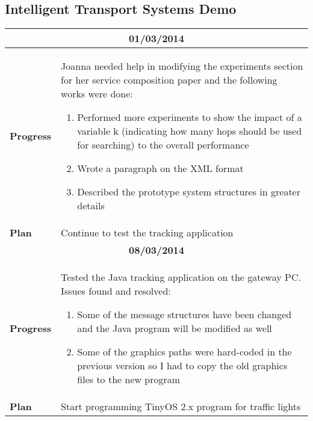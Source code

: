 \subsection{Intelligent Transport Systems Demo}

\begin{center}
	\begin{longtable}{ | p{2cm} | p{10cm} | }
		\hline
                \multicolumn{2}{|c|}{\textbf{01/03/2014}} \\ \hline
                \textbf{Progress} & Joanna needed help in modifying the experiments section for her service composition paper and the following works were done:
                \begin{enumerate}
                  \item Performed more experiments to show the impact of a variable k (indicating how many hops should be used for searching) to the overall performance
                  \item Wrote a paragraph on the XML format
                  \item Described the prototype system structures in greater details
                \end{enumerate}  \\ \hline
                \textbf{Plan} & Continue to test the tracking application \\ \hline

                \multicolumn{2}{|c|}{\textbf{08/03/2014}} \\ \hline
                \textbf{Progress} & Tested the Java tracking application on the gateway PC. Issues found and resolved:
                \begin{enumerate}
                  \item Some of the message structures have been changed and the Java program will be modified as well
                  \item Some of the graphics paths were hard-coded in the previous version so I had to copy the old graphics files to the new program
                \end{enumerate}  \\ \hline
                \textbf{Plan} & Start programming TinyOS 2.x program for traffic lights \\ \hline


\end{longtable}
\end{center}
